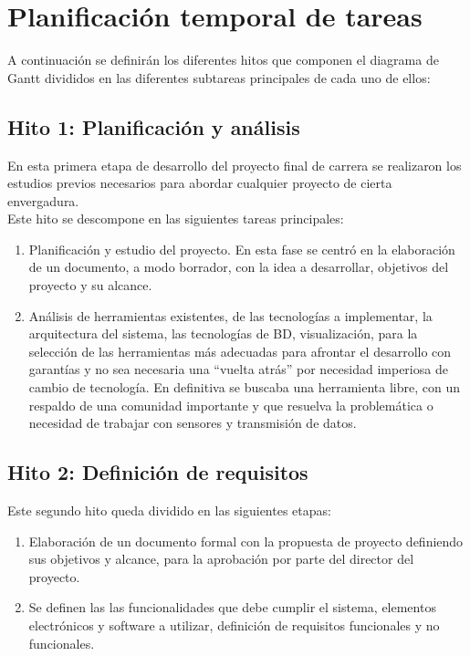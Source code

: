 \section{Planificación temporal de tareas}

A continuación se definirán los diferentes hitos que componen el diagrama de Gantt divididos en las diferentes subtareas principales de cada uno de ellos:\\

\subsection{Hito 1: Planificación y análisis }
\label{subsec:hito1}

En esta primera etapa de desarrollo del proyecto final de carrera se realizaron los estudios previos necesarios para abordar cualquier proyecto de cierta envergadura.\\

Este hito se descompone en las siguientes tareas principales:

\begin{enumerate}
 \item Planificación y estudio del proyecto. En esta fase se centró en la elaboración de un documento, a modo borrador, con la idea a desarrollar, objetivos del proyecto y su alcance.
 \item Análisis de herramientas existentes, de las tecnologías a implementar, la arquitectura del sistema, las tecnologías de BD, visualización, para la selección de las herramientas más adecuadas 
 para afrontar el desarrollo con garantías y no sea necesaria una ``vuelta atrás'' por necesidad imperiosa de cambio de tecnología. En definitiva se buscaba una herramienta libre, con un respaldo de una comunidad importante
 y que resuelva la problemática o necesidad de trabajar con sensores y transmisión de datos.
\end{enumerate}

\subsection{Hito 2: Definición de requisitos }
\label{subsec:hito2}

Este segundo hito queda dividido en las siguientes etapas:

\begin{enumerate}
 \item Elaboración de un documento formal con la propuesta de proyecto definiendo sus objetivos y alcance, para la aprobación por parte del director del proyecto.
 \item Se definen las las funcionalidades que debe cumplir el sistema, elementos electrónicos y software a utilizar, definición de requisitos funcionales y no funcionales. 
\end{enumerate}

